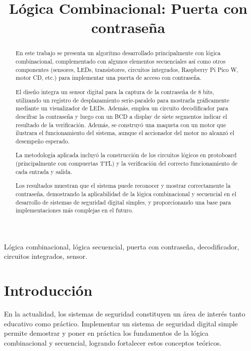\documentclass[conference]{IEEEtran}  %
\title{Lógica Combinacional: Puerta con contraseña}
\author{
    \IEEEauthorblockA{Instituto Tecnológico de Costa Rica\\
    Escuela de Ingeniería en Computadores\\
    CE1107 — Fundamentos de Arquitectura de Computadores\\}
    \IEEEauthorblockN{\\Autores: \\ Jafet José Diaz Morales - 2023053249 \\ Esteban Campos - Carnet}
}
\begin{document}
\maketitle

\begin{abstract}
En este trabajo se presenta un algoritmo desarrollado principalmente con lógica combinacional, complementado con algunos elementos secuenciales así como otros componentes (sensores, LEDs, transistores, circuitos integrados, Raspberry Pi Pico W, motor CD, etc.) para implementar una puerta de acceso con contraseña. 

El diseño integra un sensor digital para la captura de la contraseña de 8 bits, utilizando un registro de desplazamiento serie-paralelo para mostrarla gráficamente mediante un visualizador de LEDs. Además, emplea un circuito decodificador para descifrar la contraseña y luego con un BCD a display de siete segmentos indicar el resultado de la verificación. Además, se construyó una maqueta con un motor que ilustrara el funcionamiento del sistema, aunque el accionador del motor no alcanzó el desempeño esperado. 

La metodología aplicada incluyó la construcción de los circuitos lógicos en protoboard (principalmente con compuertas TTL) y la verificación del correcto funcionamiento de cada entrada y salida. 

Los resultados muestran que el sistema puede reconocer y mostrar correctamente la contraseña, demostrando la aplicabilidad de la lógica combinacional y secuencial en el desarrollo de sistemas de seguridad digital simples, y proporcionando una base para implementaciones más complejas en el futuro.
\end{abstract}


\begin{IEEEkeywords}
Lógica combinacional, lógica secuencial, puerta con contraseña, decodificador, circuitos integrados, sensor.
\end{IEEEkeywords}

\section{Introducción}
En la actualidad, los sistemas de seguridad constituyen un área de interés tanto educativo como práctico. Implementar un sistema de seguridad digital simple permite demostrar y poner en práctica los fundamentos de la lógica combinacional y secuencial, logrando fortalecer estos conceptos teóricos. 
\end{document}

